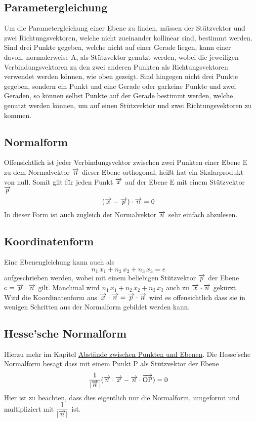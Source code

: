 \documentclass{article}
\begin{document}
\subsection{Parametergleichung}
Um die Parametergleichung einer Ebene zu finden, müssen der Stützvektor und zwei Richtungsvektoren, welche nicht zueinander kollinear sind, bestimmt werden. Sind drei Punkte gegeben, welche nicht auf einer Gerade liegen, kann einer davon, normalerweise $\mathrm{A}$, als Stützvektor genutzt werden, wobei die jeweiligen Verbindungsvektoren zu den zwei anderen Punkten als Richtungsvektoren verwendet werden können, wie oben gezeigt. \newline
Sind hingegen nicht drei Punkte gegeben, sondern ein Punkt und eine Gerade oder garkeine Punkte und zwei Geraden, so können selbst Punkte auf der Gerade bestimmt werden, welche genutzt werden können, um auf einen Stützvektor und zwei Richtungsvektoren zu kommen.
 
\subsection{Normalform}
Offensichtlich ist jeder Verbindungsvektor zwischen zwei Punkten einer Ebene $\mathrm{E}$ zu dem Normalvektor $\overrightarrow{n}$ dieser Ebene orthogonal, heißt hat ein Skalarprodukt von null. Somit gilt für jeden Punkt $\overrightarrow{x}$ auf der Ebene $\mathrm{E}$ mit einem Stützvektor $\overrightarrow{p}$
\[
 (\overrightarrow{x} - \overrightarrow{p}) \cdot \overrightarrow{n} = 0 
\]
In dieser Form ist auch zugleich der Normalvektor $\overrightarrow{n}$ sehr einfach abzulesen. 
 
\subsection{Koordinatenform}
Eine Ebenengleichung kann auch als
\[
 n_1 \, x_1 + n_2 \, x_2 + n_3 \, x_3 = e 
\]
aufgeschrieben werden, wobei mit einem beliebigen Stützvektor $\overrightarrow{p}$ der Ebene $e = \overrightarrow{p} \cdot \overrightarrow{n}$ gilt. Manchmal wird $n_1 \, x_1 + n_2 \, x_2 + n_3 \, x_3$ auch zu $\overrightarrow{x} \cdot \overrightarrow{n}$ gekürzt. Wird die Koordinatenform aus $\overrightarrow{x} \cdot \overrightarrow{n} = \overrightarrow{p} \cdot \overrightarrow{n}$ wird es offensichtlich dass sie in wenigen Schritten aus der Normalform gebildet werden kann.
 
\subsection{Hesse'sche Normalform}
Hierzu mehr im Kapitel \hyperref[Abstände zwischen Punkten und Ebenen]{Abstände zwischen Punkten und Ebenen}. Die Hesse'sche Normalform besagt dass mit einem Punkt $\mathrm{P}$ als Stützvektor der Ebene
\[
 \frac{1}{|\overrightarrow{n}|} (\overrightarrow{n} \cdot \overrightarrow{x} - \overrightarrow{n} \cdot \overrightarrow{\mathrm{OP}}) = 0 
\]
Hier ist zu beachten, dass dies eigentlich nur die Normalform, umgeformt und multipliziert mit $\dfrac{1}{|\overrightarrow{n}|}$ ist.
 
\end{document}
